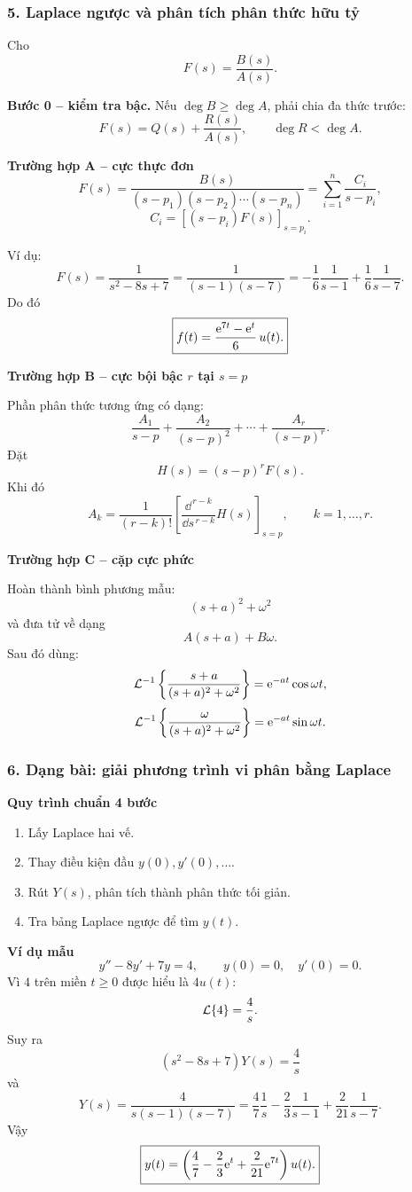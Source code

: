 \subsubsection*{5. Laplace ngược và phân tích phân thức hữu tỷ}

Cho
\[
F(s)=\frac{B(s)}{A(s)}.
\]

\textbf{Bước 0 -- kiểm tra bậc.}
Nếu $\deg B\ge\deg A$, phải chia đa thức trước:
\[
F(s)=Q(s)+\frac{R(s)}{A(s)},\qquad \deg R<\deg A.
\]

\textbf{Trường hợp A -- cực thực đơn}
\[
F(s)=\frac{B(s)}{(s-p_1)(s-p_2)\cdots(s-p_n)}
=\sum_{i=1}^{n}\frac{C_i}{s-p_i},
\]
\[
\boxed{
C_i=\left[(s-p_i)F(s)\right]_{s=p_i}.
}
\]

Ví dụ:
\[
F(s)=\frac{1}{s^2-8s+7}
=\frac{1}{(s-1)(s-7)}
=-\frac{1}{6}\frac{1}{s-1}
+\frac{1}{6}\frac{1}{s-7}.
\]
Do đó
\[
\boxed{
f(t)=\frac{\mathrm{e}^{7t}-\mathrm{e}^t}{6}\,u(t).
}
\]

\textbf{Trường hợp B -- cực bội bậc $r$ tại $s=p$}

Phần phân thức tương ứng có dạng:
\[
\frac{A_1}{s-p}
+\frac{A_2}{(s-p)^2}
+\cdots+
\frac{A_r}{(s-p)^r}.
\]
Đặt
\[
H(s)=(s-p)^rF(s).
\]
Khi đó
\[
\boxed{
A_k=
\frac{1}{(r-k)!}
\left[
\frac{\dd^{\,r-k}}{\dd s^{\,r-k}}H(s)
\right]_{s=p},
\qquad k=1,\ldots,r.
}
\]

\textbf{Trường hợp C -- cặp cực phức}

Hoàn thành bình phương mẫu:
\[
(s+a)^2+\omega^2
\]
và đưa tử về dạng
\[
A(s+a)+B\omega.
\]
Sau đó dùng:
\[
\mathcal{L}^{-1}\left\{\frac{s+a}{(s+a)^2+\omega^2}\right\}
=\mathrm{e}^{-at}\cos\omega t,
\]
\[
\mathcal{L}^{-1}\left\{\frac{\omega}{(s+a)^2+\omega^2}\right\}
=\mathrm{e}^{-at}\sin\omega t.
\]

\subsubsection*{6. Dạng bài: giải phương trình vi phân bằng Laplace}

\textbf{Quy trình chuẩn 4 bước}
\begin{enumerate}
  \item Lấy Laplace hai vế.
  \item Thay điều kiện đầu $y(0),y'(0),\ldots$.
  \item Rút $Y(s)$, phân tích thành phân thức tối giản.
  \item Tra bảng Laplace ngược để tìm $y(t)$.
\end{enumerate}

\textbf{Ví dụ mẫu}
\[
y''-8y'+7y=4,\qquad y(0)=0,\quad y'(0)=0.
\]
Vì $4$ trên miền $t\ge0$ được hiểu là $4u(t)$:
\[
\mathcal{L}\{4\}=\frac4s.
\]
Suy ra
\[
(s^2-8s+7)Y(s)=\frac4s
\]
và
\[
Y(s)=\frac{4}{s(s-1)(s-7)}
=\frac{4}{7}\frac1s-\frac23\frac1{s-1}+\frac{2}{21}\frac1{s-7}.
\]
Vậy
\[
\boxed{
y(t)=
\left(
\frac47-\frac23\mathrm{e}^t+\frac{2}{21}\mathrm{e}^{7t}
\right)u(t).
}
\]

